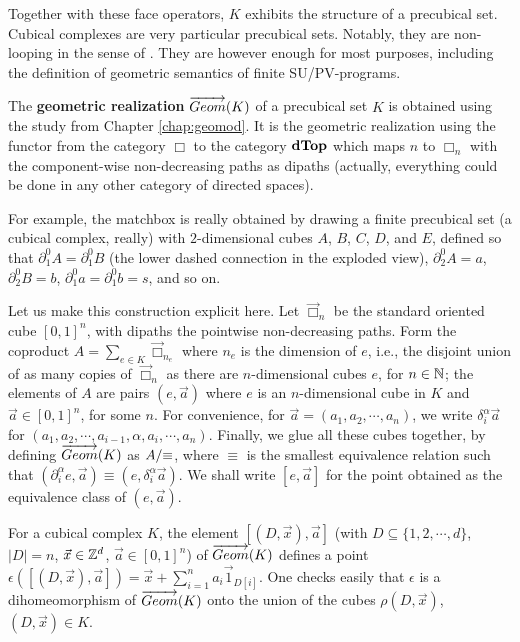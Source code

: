 Together with these face operators, $K$ exhibits the structure of a
precubical set. Cubical complexes are very particular
precubical sets. Notably, they are non-looping in the sense of \cite{fajstrup05}.  They are however enough for most purposes,
including the definition of geometric semantics of finite
SU/PV-programs.

The \textbf{geometric realization} $\overrightarrow{Geom}(K)$ of a precubical set $K$
is obtained using the study from Chapter \ref{chap:geomod}. It is the geometric realization using the functor from the category $\Box$ to the category $\textbf{dTop}$ which maps $n$ to $\Box_n$ with the component-wise non-decreasing paths as dipaths (actually, everything could be done in any other category of directed spaces).


For example, the
matchbox is really obtained by drawing a
finite precubical set (a cubical complex, really) with $2$-dimensional
cubes $A$, $B$, $C$, $D$, and $E$, defined so that $\partial_1^0 A
= \partial_1^0 B$ (the lower dashed connection in the exploded view),
$\partial_2^0 A = a$, $\partial_2^0 B = b$, $\partial_1^0 a
= \partial_1^0 b = s$, and so on. 

Let us make this construction explicit here. Let $\overrightarrow\Box_n$
be the standard oriented cube $[0, 1]^n$, with dipaths the pointwise non-decreasing paths.
Form the coproduct $A = \sum_{e \in K} \overrightarrow \Box_{n_e}$ where
$n_e$ is the dimension of $e$, i.e., the disjoint union of as many
copies of $\overrightarrow \Box_n$ as there are $n$-dimensional cubes
$e$, for $n \in \mathbb{N}$; the elements of $A$ are pairs $(e, \vec a)$
where $e$ is an $n$-dimensional cube in $K$ and $\vec a \in [0, 1]^n$,
for some $n$.  For convenience, for $\vec a = (a_1, a_2, \cdots,
a_n)$, we write $\delta_i^\alpha \vec a$ for $(a_1, a_2, \cdots,
a_{i-1}, \alpha, a_i, \cdots, a_n)$.  Finally, we glue all these cubes
together, by defining $\overrightarrow{Geom}(K)$ as ${A}/{\equiv}$, where $\equiv$
is the smallest equivalence relation such that $(\partial_i^\alpha e,
\vec a) \equiv (e, \delta_i^\alpha \vec a)$.  We shall write $[e, \vec
a]$ for the point obtained as the equivalence class of $(e, \vec a)$.


For a cubical complex $K$, the element $[(D, \vec x), \vec a]$ (with
$D \subseteq \{1, 2, \cdots, d\}$, $\lvert D \rvert=n$, $\vec x \in \mathbb{Z}^d$, $\vec a
\in [0, 1]^n$) of $\overrightarrow{Geom}(K)$ defines a point $\epsilon ([(D, \vec x),
\vec a]) = \vec x + \sum_{i=1}^n a_i \vec 1_{D [i]}$.  One checks
easily that $\epsilon$ is a dihomeomorphism of $\overrightarrow{Geom}(K)$ onto
the union of the cubes $\rho (D, \vec x)$, $(D, \vec x) \in K$.

